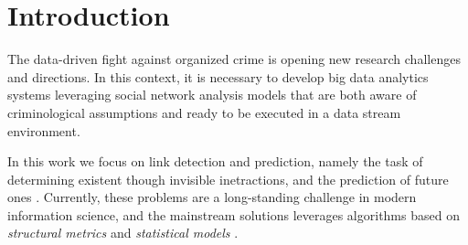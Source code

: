 \section{Introduction}
\label{sec:introduction}

The data-driven fight against organized crime is opening new research challenges and directions. 
In this context, it is necessary to develop big data analytics systems leveraging social network analysis models that are both aware of criminological assumptions and ready to be executed in a data stream environment.

In this work we focus on link detection and prediction, namely the task of determining existent though invisible inetractions, and the prediction of future ones \cite{Hasan2011}.
Currently, these problems are a long-standing challenge in modern information science, and the mainstream solutions leverages algorithms based on 
\textit{structural metrics} and \textit{statistical models} \cite{Liben-Nowell,Lu2011}.


 



